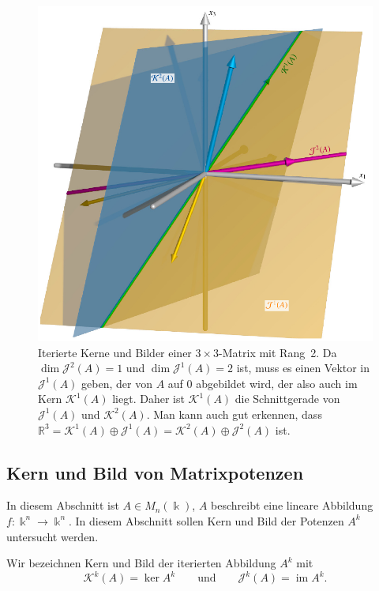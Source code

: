 \begin{figure}
\centering
\includegraphics[width=\textwidth]{chapters/40-eigenwerte/images/kombiniert.pdf}
\caption{Iterierte Kerne und Bilder einer $3\times 3$-Matrix mit Rang~2.
Da $\dim\mathcal{J}^2(A)=1$ und $\dim\mathcal{J}^1(A)=2$ ist, muss es
einen Vektor in $\mathcal{J}^1(A)$ geben, der von $A$ auf $0$ abgebildet
wird, der also auch im Kern $\mathcal{K}^1(A)$ liegt.
Daher ist $\mathcal{K}^1(A)$ die Schnittgerade von $\mathcal{J}^1(A)$ und
$\mathcal{K}^2(A)$.
Man kann auch gut erkennen, dass
$\mathbb{R}^3
=
\mathcal{K}^1(A)\oplus \mathcal{J}^1(A)
=
\mathcal{K}^2(A) \oplus \mathcal{J}^2(A)$
ist.
\label{buch:eigenwerte:img:kombiniert}}
\end{figure}

%
%
\subsection{Kern und Bild von Matrixpotenzen
\label{buch:subsection:kern-und-bild}}
In diesem Abschnitt ist $A\in M_n(\Bbbk)$, $A$ beschreibt eine lineare
Abbildung $f\colon\Bbbk^n\to \Bbbk^n$.
In diesem Abschnitt sollen Kern und Bild der Potenzen $A^k$ untersucht
werden.
\begin{definition}
Wir bezeichnen Kern und Bild der iterierten Abbildung $A^k$ mit
\[
\mathcal{K}^k(A)
=
\ker A^k
\qquad\text{und}\qquad
\mathcal{J}^k(A)
=
\operatorname{im} A^k.
\]
\end{definition}

